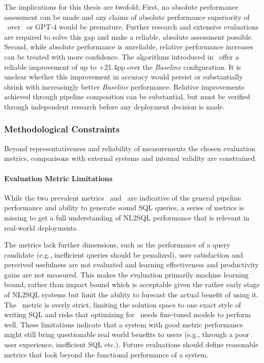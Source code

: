 The implications for this thesis are twofold; First, no absolute performance
assessment can be made and any claims of absolute performance superiority of
\Natural~over \OmniSQL~or GPT-4 would be premature. Further research and
extensive evaluations are required to solve this gap and make a reliable,
absolute assessment possible. Second, while absolute performance is unreliable,
relative performance increases can be treated with more confidence. The
algorithms introduced in \Natural~offer a reliable improvement of up to +21.4pp
over the \textit{Baseline} configuration. It is unclear whether this
improvement in accuracy would persist or substantially shrink with increasingly
better \textit{Baseline} performance. Relative improvements achieved through
pipeline composition can be substantial, but must be verified through
independent research before any deployment decision is made.

\subsubsection{Methodological Constraints}

Beyond representativeness and reliability of measurements the chosen evaluation
metrics, comparisons with external systems and internal validity are
constrained.

\paragraph{Evaluation Metric Limitations}

While the two prevalent metrics \EA~and \EM~are indicative of the general
pipeline performance and ability to generate sound SQL queries, a series of
metrics is missing to get a full understanding of NL2SQL performance that is
relevant in real-world deployments.

The metrics lack further dimensions, such as the performance of a query
candidate (e.g., inefficient queries should be penalized), user satisfaction
and perceived usefulness are not evaluated and learning effectiveness and
productivity gains are not measured. This makes the evaluation primarily
machine learning bound, rather than impact bound which is acceptable given the
rather early stage of NL2SQL systems but limit the ability to forecast the
actual benefit of using it. The \EM~metric is overly strict, limiting the
solution space to one exact style of writing SQL and risks that optimizing for
\EM~needs fine-tuned models to perform well. These limitations indicate that a
system with good metric performance might still bring questionable real world
benefits to users (e.g., through a poor user experience, inefficient SQL etc.).
Future evaluations should define reasonable metrics that look beyond the
functional performance of a system.

